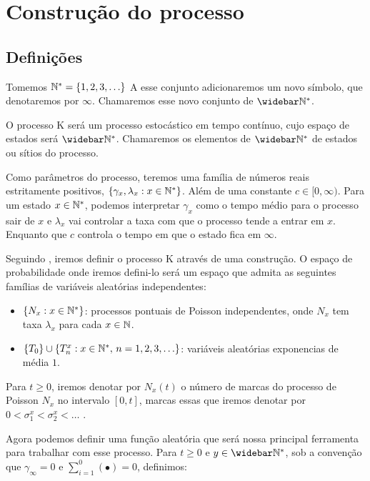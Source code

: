 \chapter{Construção do processo}
\label{cap:construcao}

\section{Definições}
\label{sec:definicoes}

Tomemos ${\mathbb{N^*}} = \{ 1, 2, 3, \ldots\}$ A esse conjunto adicionaremos um
novo símbolo, que denotaremos por $\infty$. Chamaremos esse novo
conjunto de $\Nzb$.

O processo K será um processo estocástico em tempo contínuo, cujo
espaço de estados será $\Nzb$. Chamaremos os elementos de $\Nzb$ de
estados ou sítios do processo.

Como parâmetros do processo, teremos uma família de números reais
estritamente positivos, $\{\gamma_x, \lambda_x : x \in {\mathbb{N^*}}\}$. Além de
uma constante $c \in [0, \infty)$.  Para um estado $x \in {\mathbb{N^*}}$,
podemos interpretar $\gamma_x$ como o tempo médio para o processo sair
de $x$ e $\lambda_x$ vai controlar a taxa com que o processo tende a
entrar em $x$. Enquanto que $c$ controla o tempo em que o estado fica
em $\infty$.

Seguindo \cite{fontes:08}, iremos definir o processo K através de uma
construção. O espaço de probabilidade onde iremos defini-lo
será um espaço que admita as seguintes famílias de variáveis
aleatórias independentes:

\begin{itemize}
\item $\{ N_x: x \in {\mathbb{N^*}} \}$: processos pontuais de Poisson
  independentes, onde $N_x$ tem taxa $\lambda_x$ para cada $x \in {\mathbb{N}}$.
\item $\{T_0\} \cup \{T_n^x: x \in {\mathbb{N^*}} , \, n = 1, 2, 3, \ldots \}$:
  variáveis aleatórias exponencias de média $1$.
\end{itemize}

Para $t \geq 0$, iremos denotar por $N_x(t)$ o número de marcas do
processo de Poisson $N_x$ no intervalo $[0, t]$, marcas essas que
iremos denotar por $0 < \sigma_1^x < \sigma_2^x < \ldots$ .

Agora podemos definir uma função aleatória que será nossa principal
ferramenta para trabalhar com esse processo. Para $t \geq 0$ e $y \in
\Nzb$, sob a convenção que $\gamma_\infty = 0$ e $\sum_{i=1}^{0}(
\bullet ) = 0$, definimos:

